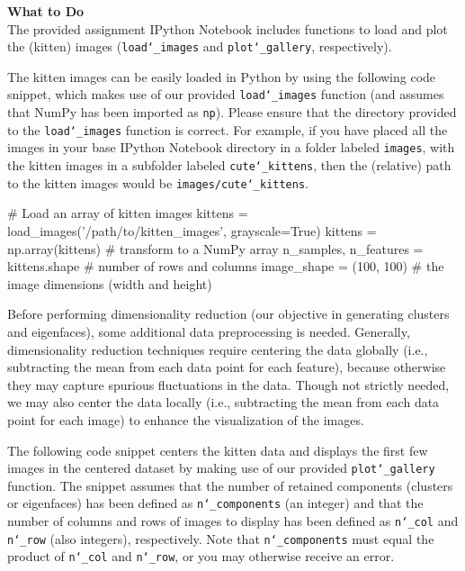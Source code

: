 \documentclass[paper=a4, fontsize=11pt]{scrartcl} %
\numberwithin{equation}{section} %
\numberwithin{figure}{section} %
\numberwithin{table}{section} %
\begin{document}
\textbf{What to Do}\\
The provided assignment IPython Notebook includes functions to load and plot the (kitten) images (\texttt{load\char`_images} and \texttt{plot\char`_gallery}, respectively).

\vspace{6pt}

The kitten images can be easily loaded in Python by using the following code snippet, which makes use of our provided \texttt{load\char`_images} function (and assumes that NumPy has been imported as \texttt{np}). Please ensure that the directory provided to the \texttt{load\char`_images} function is correct. For example, if you have placed all the images in your base IPython Notebook directory in a folder labeled \texttt{images}, with the kitten images in a subfolder labeled \texttt{cute\char`_kittens}, then the (relative) path to the kitten images would be \texttt{images/cute\char`_kittens}.

\vspace{6pt}

\begin{adjustbox}{minipage=0.8\textwidth,margin=0pt \smallskipamount,center}
\begin{python}
# Load an array of kitten images
kittens = load_images('/path/to/kitten_images', grayscale=True)
kittens = np.array(kittens) # transform to a NumPy array
n_samples, n_features = kittens.shape # number of rows and columns
image_shape = (100, 100) # the image dimensions (width and height)
\end{python}
\end{adjustbox}

\vspace{6pt}

Before performing dimensionality reduction (our objective in generating clusters and eigenfaces), some additional data preprocessing is needed. Generally, dimensionality reduction techniques require centering the data globally (i.e., subtracting the mean from each data point for each feature), because otherwise they may capture spurious fluctuations in the data. Though not strictly needed, we may also center the data locally (i.e., subtracting the mean from each data point for each image) to enhance the visualization of the images.

\vspace{6pt}

The following code snippet centers the kitten data and displays the first few images in the centered dataset by making use of our provided \texttt{plot\char`_gallery} function. The snippet assumes that the number of retained components  (clusters or eigenfaces) has been defined as \texttt{n\char`_components} (an integer) and that the number of columns and rows of images to display has been defined as  \texttt{n\char`_col} and  \texttt{n\char`_row} (also integers), respectively. Note that \texttt{n\char`_components} must equal the product of \texttt{n\char`_col} and \texttt{n\char`_row}, or you may otherwise receive an error.
\end{document}
